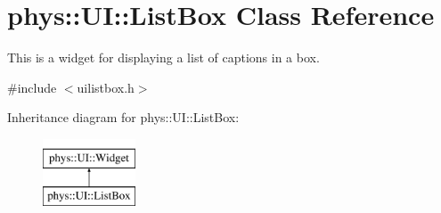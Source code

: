 \hypertarget{classphys_1_1UI_1_1ListBox}{
\section{phys::UI::ListBox Class Reference}
\label{d0/d28/classphys_1_1UI_1_1ListBox}
}


This is a widget for displaying a list of captions in a box.  




{\ttfamily \#include $<$uilistbox.h$>$}

Inheritance diagram for phys::UI::ListBox:\begin{figure}[H]
\begin{center}
\leavevmode
\includegraphics[height=2.000000cm]{d0/d28/classphys_1_1UI_1_1ListBox}
\end{center}
\end{figure}
